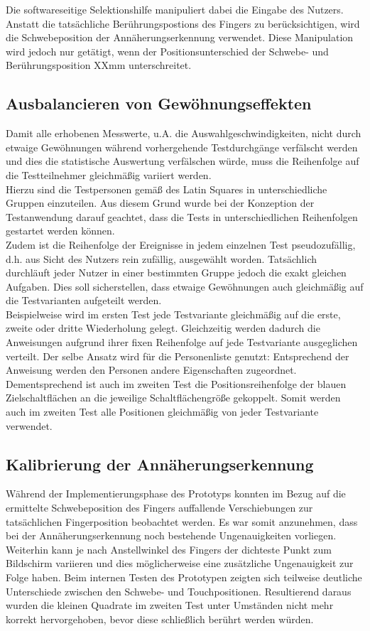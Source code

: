 \documentclass[a4paper,BCOR2mm,12pt,bibliography=totoc,listof=totoc,abstracton]{scrreprt}
\begin{document}
Die softwareseitige Selektionshilfe manipuliert dabei die Eingabe des Nutzers. Anstatt die tatsächliche Berührungspostions des Fingers zu berücksichtigen, wird die Schwebeposition der Annäherungserkennung verwendet. Diese Manipulation wird jedoch nur getätigt, wenn der Positionsunterschied der Schwebe- und Berührungsposition XXmm unterschreitet.

\subsection{Ausbalancieren von Gewöhnungseffekten}
Damit alle erhobenen Messwerte, u.A. die Auswahlgeschwindigkeiten, nicht durch etwaige Gewöhnungen während vorhergehende Testdurchgänge verfälscht werden und dies die statistische Auswertung verfälschen würde, muss die Reihenfolge auf die Testteilnehmer gleichmäßig variiert werden.\\
Hierzu sind die Testpersonen gemäß des Latin Squares in unterschiedliche Gruppen einzuteilen. Aus diesem Grund wurde bei der Konzeption der Testanwendung darauf geachtet, dass die Tests in unterschiedlichen Reihenfolgen gestartet werden können.\\
Zudem ist die Reihenfolge der Ereignisse in jedem einzelnen Test pseudozufällig, d.h. aus Sicht des Nutzers rein zufällig, ausgewählt worden. Tatsächlich durchläuft jeder Nutzer in einer bestimmten Gruppe jedoch die exakt gleichen Aufgaben. Dies soll sicherstellen, dass etwaige Gewöhnungen auch gleichmäßig auf die Testvarianten aufgeteilt werden.\\
Beispielweise wird im ersten Test jede Testvariante gleichmäßig auf die erste, zweite oder dritte Wiederholung gelegt. Gleichzeitig werden dadurch die Anweisungen aufgrund ihrer fixen Reihenfolge auf jede Testvariante ausgeglichen verteilt. Der selbe Ansatz wird für die Personenliste genutzt: Entsprechend der Anweisung werden den Personen andere Eigenschaften zugeordnet. Dementsprechend ist auch im zweiten Test die Positionsreihenfolge der blauen Zielschaltflächen an die jeweilige Schaltflächengröße gekoppelt. Somit werden auch im zweiten Test alle Positionen gleichmäßig von jeder Testvariante verwendet.

\subsection{Kalibrierung der Annäherungserkennung}
Während der Implementierungsphase des Prototyps konnten im Bezug auf die ermittelte Schwebeposition des Fingers auffallende  Verschiebungen zur tatsächlichen Fingerposition beobachtet werden. Es war somit anzunehmen, dass bei der Annäherungserkennung noch bestehende Ungenauigkeiten vorliegen. Weiterhin kann je nach Anstellwinkel des Fingers der dichteste Punkt zum Bildschirm variieren und dies möglicherweise eine zusätzliche Ungenauigkeit zur Folge haben. Beim internen Testen des Prototypen zeigten sich teilweise deutliche Unterschiede zwischen den Schwebe- und Touchpositionen. Resultierend daraus wurden die kleinen Quadrate im zweiten Test unter Umständen nicht mehr korrekt hervorgehoben, bevor diese schließlich berührt werden würden.
\end{document}
